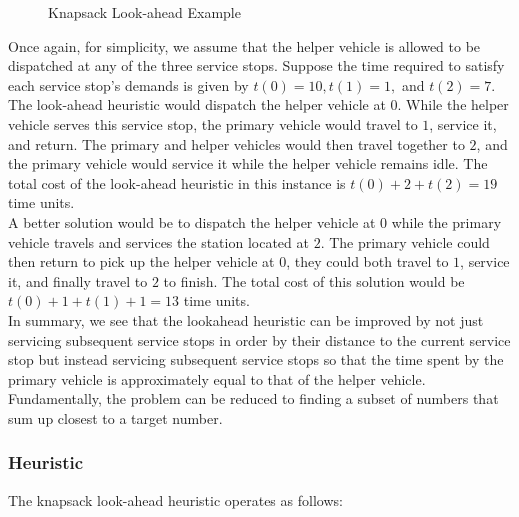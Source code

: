\documentclass[12pt]{scrartcl}
\begin{document}
\begin{figure}[H]
  \centering
  \caption{Knapsack Look-ahead Example}
\end{figure}

\noindent Once again, for simplicity, we assume that the helper vehicle is allowed to be dispatched at any of the three service stops. Suppose the time required to satisfy each service stop's demands is given by $t(0) = 10, t(1) = 1,$ and $t(2) = 7$. \\

The look-ahead heuristic would dispatch the helper vehicle at $0$. While the helper vehicle serves this service stop, the primary vehicle would travel to $1$, service it, and return. The primary and helper vehicles would then travel together to $2$, and the primary vehicle would service it while the helper vehicle remains idle. The total cost of the look-ahead heuristic in this instance is $t(0) + 2 + t(2) = 19$ time units. \\

A better solution would be to dispatch the helper vehicle at $0$ while the primary vehicle travels and services the station located at $2$. The primary vehicle could then return to pick up the helper vehicle at $0$, they could both travel to $1$, service it, and finally travel to $2$ to finish. The total cost of this solution would be $t(0) + 1 + t(1) + 1 = 13$ time units. \\

In summary, we see that the lookahead heuristic can be improved by not just servicing subsequent service stops in order by their distance to the current service stop but instead servicing subsequent service stops so that the time spent by the primary vehicle is approximately equal to that of the helper vehicle. Fundamentally, the problem can be reduced to finding a subset of numbers that sum up closest to a target number. 

\subsubsection{Heuristic}
The knapsack look-ahead heuristic operates as follows:
\end{document}
